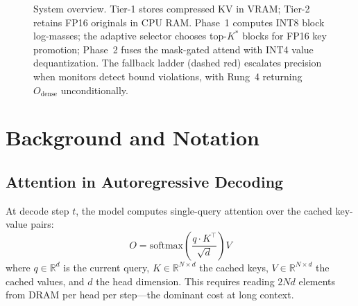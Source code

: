 \documentclass[10pt,twocolumn,a4paper]{article}
\theoremstyle{definition}
\theoremstyle{remark}
\newcommand{\R}{\mathbb{R}}
\begin{document}
\begin{figure}[!t]
{
}
\caption{System overview.  Tier-1 stores compressed KV in VRAM; Tier-2 retains FP16 originals in CPU RAM\@.  Phase~1 computes INT8 block log-masses; the adaptive selector chooses top-$K^*$ blocks for FP16 key promotion; Phase~2 fuses the mask-gated attend with INT4 value dequantization.  The fallback ladder (dashed red) escalates precision when monitors detect bound violations, with Rung~4 returning $O_{\mathrm{dense}}$ unconditionally.}
\label{fig:overview}
\end{figure}

\section{Background and Notation}
\label{sec:background}

\subsection{Attention in Autoregressive Decoding}

At decode step $t$, the model computes single-query attention over the cached key-value pairs:
\begin{equation}
\label{eq:attention}
  O = \mathrm{softmax}\!\left(\frac{q \cdot K^\top}{\sqrt{d}}\right) V
\end{equation}
where $q \in \R^d$ is the current query, $K \in \R^{N \times d}$ the cached keys, $V \in \R^{N \times d}$ the cached values, and $d$ the head dimension.  This requires reading $2Nd$ elements from DRAM per head per step---the dominant cost at long context.
\end{document}
